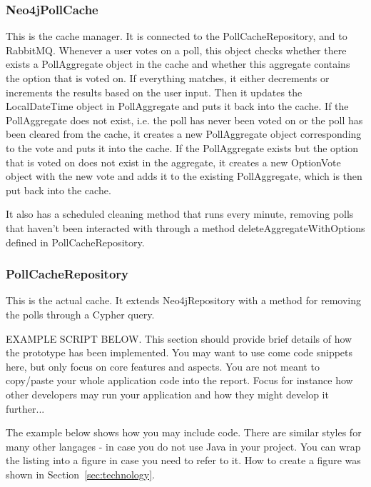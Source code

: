 \subsubsection{Neo4jPollCache}
This is the cache manager. It is connected to the PollCacheRepository, and to RabbitMQ. Whenever a user votes on a poll, this object checks whether there exists a PollAggregate object in the cache and whether this aggregate contains the option that is voted on. If everything matches, it either decrements or increments the results based on the user input. Then it updates the LocalDateTime object in PollAggregate and puts it back into the cache. If the PollAggregate does not exist, i.e. the poll has never been voted on or the poll has been cleared from the cache, it creates a new PollAggregate object corresponding to the vote and puts it into the cache. If the PollAggregate exists but the option that is voted on does not exist in the aggregate, it creates a new OptionVote object with the new vote and adds it to the existing PollAggregate, which is then put back into the cache.   

It also has a scheduled cleaning method that runs every minute, removing polls that haven't been interacted with through a method deleteAggregateWithOptions defined in PollCacheRepository.

\subsubsection{PollCacheRepository}
This is the actual cache. It extends Neo4jRepository with a method for removing the polls through a Cypher query.



EXAMPLE SCRIPT BELOW.
This section should provide brief details of how the prototype has been implemented.
You may want to use come code snippets here, but only focus on core features and aspects.
You are not meant to copy/paste your whole application code into the report.
Focus for instance how other developers may run your application and how they might develop it further...


The example below shows how you may include code. There are similar
styles for many other langages - in case you do not use Java in your
project. You can wrap the listing into a figure in case you need to
refer to it. How to create a figure was shown in Section~\ref{sec:technology}.


